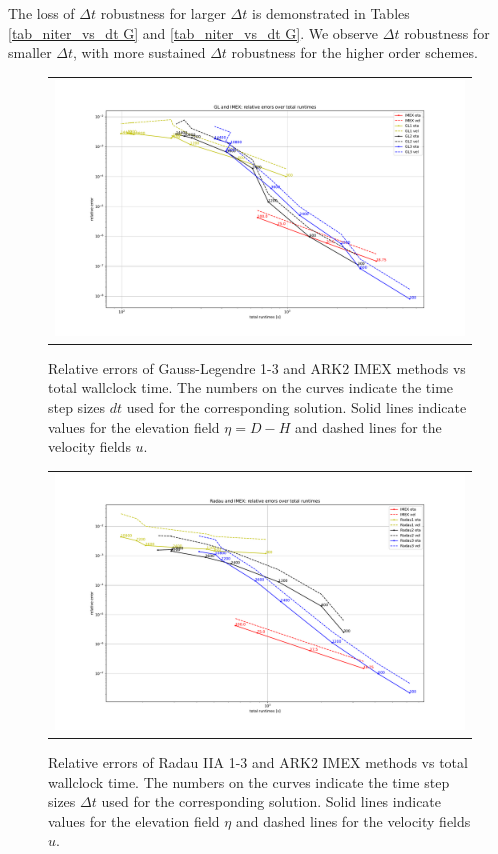 \documentclass[a4paper, 12pt]{article}
\begin{document}
The loss of $\Delta t$ robustness for larger $\Delta t$ is demonstrated
in Tables \ref{tab_niter_vs_dt G} and \ref{tab_niter_vs_dt G}. We observe
$\Delta t$ robustness for smaller $\Delta t$, with more sustained $\Delta t$
robustness for the higher order schemes.

\begin{figure}[h]\centering
\begin{tabular}{c}
 \hspace{-0.0em}\includegraphics[scale=0.42]{Images/gl_imex.pdf}
\end{tabular}
 \caption{Relative errors of Gauss-Legendre 1-3 and ARK2 IMEX methods
   vs total wallclock time. The numbers on the curves indicate the
   time step sizes $dt$ used for the corresponding solution. Solid
   lines indicate values for the elevation field $\eta=D-H$ and dashed lines
   for the velocity fields $ u$.}
 \label{err_vs_runtime_gl_imex}
\end{figure}

\begin{figure}[h]\centering
\begin{tabular}{c}
 \hspace{-0.0em}\includegraphics[scale=0.42]{Images/rd_imex.pdf}
\end{tabular}
 \caption{Relative errors of Radau IIA 1-3 and ARK2 IMEX methods vs total
   wallclock time. The numbers on the curves indicate the
   time step sizes $\Delta t$ used for the corresponding solution. Solid
   lines indicate values for the elevation field $\eta$ and dashed lines
   for the velocity fields $ u$.  }
 \label{err_vs_runtime_rd_imex}
\end{figure}
\end{document}
